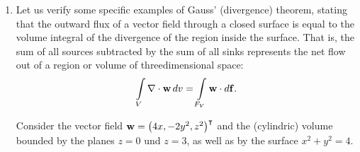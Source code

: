 {\begin{enumerate}
\begin{eqnarray*}
\mbox{rot}{\bf w}& =& \nabla \times {\bf w}  \\
  \varepsilon_{ijk}\partial_j w_k & = &
     \varepsilon_{ijk}
    \left[
      \left(-\frac{1}{r^2}\right)\left(\frac{1}{2r}\right)
      2 r_j p_k +
      \frac{1}{r}p_k'
      \left(-\frac{1}{c}\right)\left(\frac{1}{2r}\right)2r_j
    \right] \\
  & = & -\frac{1}{r^3}\varepsilon_{ijk}r_j p_k -\frac{1}{cr^2}
    \varepsilon_{ijk}r_j p_k' = \\
  & \equiv & -\frac{1}{r^3}\left({\bf r} \times {\bf p}\right)-
    \frac{1}{cr^2}\left({\bf r} \times {\bf p}'\right)   .
\end{eqnarray*}

\item
Let us verify  some specific examples of Gauss' (divergence) theorem,
stating that the outward flux of a vector field through a closed surface
is equal to the volume integral of the divergence of the region inside the surface.
That is, the sum of all sources subtracted by the sum of all sinks represents the net flow out of a region or volume of threedimensional space:
\begin{equation}
\int \limits_V \nabla \cdot {\bf w} \, dv   =\int \limits_{F_V} {\bf w} \cdot d{\bf f}
.   \label{2011-m-gauss}
\end{equation}

Consider the vector field ${\bf w} = \begin{pmatrix} 4x , -2y^2 , z^2\end{pmatrix}^\intercal $
and the (cylindric) volume bounded by the planes  $z=0$ und $z=3$,
as well as by the surface
$x^2 + y^2 = 4$.



\end{enumerate}}
